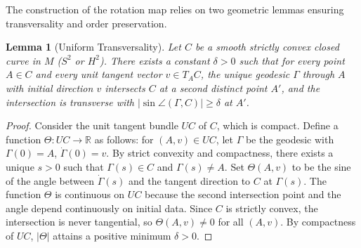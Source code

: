 \documentclass{article}
\newtheorem{lemma}[theorem]{Lemma}
\begin{document}
The construction of the rotation map relies on two geometric lemmas ensuring transversality and order preservation.
\begin{lemma}[Uniform Transversality]\label{lem:transverse}
    Let $C$ be a smooth strictly convex closed curve in $M$ ($S^2$ or $H^2$). There exists a constant $\delta > 0$ such that for every point $A \in C$ and every unit tangent vector $v \in T_A C$, the unique geodesic $\Gamma$ through $A$ with initial direction $v$ intersects $C$ at a second distinct point $A'$, and the intersection is transverse with $|\sin \angle(\Gamma, C)| \ge \delta$ at $A'$.
\end{lemma}
\begin{proof}
    Consider the unit tangent bundle $UC$ of $C$, which is compact. Define a function $\Theta: UC \to \mathbb{R}$ as follows: for $(A,v) \in UC$, let $\Gamma$ be the geodesic with $\Gamma(0)=A$, $\dot{\Gamma}(0)=v$. By strict convexity and compactness, there exists a unique $s > 0$ such that $\Gamma(s) \in C$ and $\Gamma(s) \neq A$. Set $\Theta(A,v)$ to be the sine of the angle between $\dot{\Gamma}(s)$ and the tangent direction to $C$ at $\Gamma(s)$. The function $\Theta$ is continuous on $UC$ because the second intersection point and the angle depend continuously on initial data. Since $C$ is strictly convex, the intersection is never tangential, so $\Theta(A,v) \neq 0$ for all $(A,v)$. By compactness of $UC$, $|\Theta|$ attains a positive minimum $\delta > 0$.
\end{proof}
\end{document}
